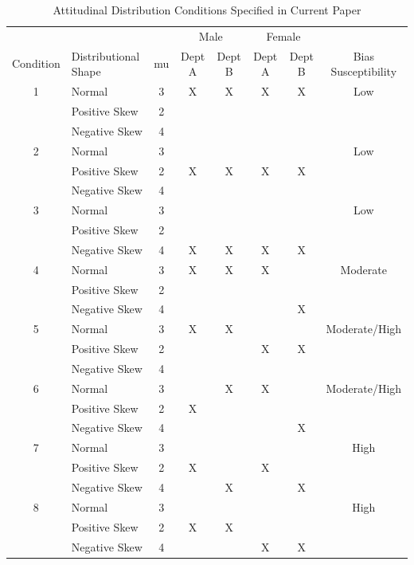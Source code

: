 \documentclass[
  man,mask]{apa7}
\begin{document}
\begin{table}[tbp]

\begin{center}
\begin{threeparttable}

\caption{\label{tab:Tab1}Attitudinal Distribution Conditions Specified in Current Paper}

\small{

\begin{tabular}{clcccccc}
\toprule
 &  &  & \multicolumn{2}{c}{Male} & \multicolumn{2}{c}{Female}  &\\
\cmidrule(r){4-5} \cmidrule(r){6-7}
Condition & Distributional Shape & mu & Dept A & Dept B & Dept A & Dept B & Bias Susceptibility\\
\midrule
1 & Normal & 3 & X & X & X & X & Low\\
 & Positive Skew & 2 &  &  &  &  & \\
 & Negative Skew & 4 &  &  &  &  & \\
2 & Normal & 3 &  &  &  &  & Low\\
 & Positive Skew & 2 & X & X & X & X & \\
 & Negative Skew & 4 &  &  &  &  & \\
3 & Normal & 3 &  &  &  &  & Low\\
 & Positive Skew & 2 &  &  &  &  & \\
 & Negative Skew & 4 & X & X & X & X & \\
4 & Normal & 3 & X & X & X &  & Moderate\\
 & Positive Skew & 2 &  &  &  &  & \\
 & Negative Skew & 4 &  &  &  & X & \\
5 & Normal & 3 & X & X &  &  & Moderate/High\\
 & Positive Skew & 2 &  &  & X & X & \\
 & Negative Skew & 4 &  &  &  &  & \\
6 & Normal & 3 &  & X & X &  & Moderate/High\\
 & Positive Skew & 2 & X &  &  &  & \\
 & Negative Skew & 4 &  &  &  & X & \\
7 & Normal & 3 &  &  &  &  & High\\
 & Positive Skew & 2 & X &  & X &  & \\
 & Negative Skew & 4 &  & X &  & X & \\
8 & Normal & 3 &  &  &  &  & High\\
 & Positive Skew & 2 & X & X &  &  & \\
 & Negative Skew & 4 &  &  & X & X & \\
\bottomrule
\end{tabular}

}

\end{threeparttable}
\end{center}

\end{table}
\end{document}
